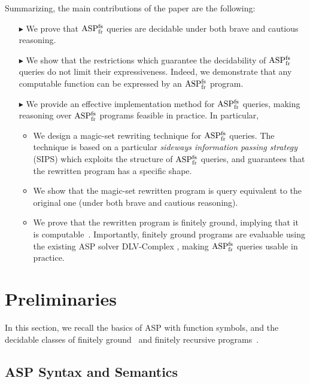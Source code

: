 \documentclass{tlp}
\newcommand{\dlv}{{\sc DLV}\xspace}
\newcommand{\ASPFNFR}{\ensuremath{\rm ASP^{\rm fs}_{\rm fr}}}
\begin{document}
Summarizing, the main contributions of the paper are the following:
\begin{itemize}
\item[$\blacktriangleright$] 
\vspace{-0.2cm}We prove that \ASPFNFR{} queries are decidable
under both brave and cautious reasoning.
\item[$\blacktriangleright$] 
We show that the restrictions which guarantee the
decidability of \ASPFNFR{} queries do not limit
their expressiveness.
Indeed, we demonstrate that any computable function can be expressed
by an \ASPFNFR{} program.
\item[$\blacktriangleright$] 
We provide an effective implementation method for 
\ASPFNFR{} queries, making reasoning over \ASPFNFR{} programs 
feasible in practice. In particular,
\begin{itemize}
\item
\vspace{-0.2cm}We design a magic-set rewriting technique for \ASPFNFR{}
queries.
The technique is based on a particular {\em sideways information
passing strategy} (SIPS) which exploits the
structure of \ASPFNFR{} queries, and guarantees that
the rewritten program has a specific shape.
\item
We show that the magic-set rewritten program is query equivalent to the original
one (under both brave and cautious reasoning).
\item
We prove that the rewritten program is finitely ground,
implying that it is computable~\cite{cali-etal-2008-iclp}.
Importantly, finitely ground programs are evaluable using the existing ASP solver \dlv-Complex \cite{dlvcomplex-web}, making 
\ASPFNFR{} queries usable in practice.
\end{itemize}
\end{itemize}


\section{Preliminaries}\label{sec:preliminaries}

In this section, we recall the basics of ASP with function symbols, and
the decidable classes of finitely ground~\cite{cali-etal-2008-iclp}
and finitely recursive programs~\cite{base-etal-2009-tplp}.

\subsection{ASP Syntax and Semantics}
\end{document}
